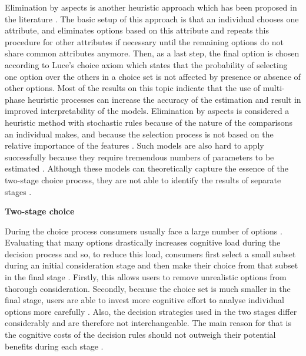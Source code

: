 \documentclass[a4paper,12pt]{article}
\begin{document}
Elimination by aspects is another heuristic approach which has been
proposed in the literature \citep{tversky1972elimination}. The basic setup of this approach is that an individual chooses one attribute, and eliminates options based on this attribute and repeats this procedure for other attributes if necessary until the remaining options do not share common attributes anymore. Then, as a last step, the final option is chosen according to Luce’s choice axiom \citep{luce2012individual} which states that the probability of selecting one option over the others in a choice set is not affected by presence or absence of other options. Most of the results on this topic \citep{batsell1985new,gensch1987two,manrai1989elimination,currim1988disaggregate} indicate that the use of multi-phase heuristic processes can increase the accuracy of the estimation and result in improved interpretability of the models. Elimination by aspects is considered a heuristic method with stochastic rules because of the nature of the comparisons an individual makes, and because the selection process is not based on the relative importance of the features 
\citep{aribarg2018advancing}. Such models are also hard to apply successfully because they require tremendous numbers of parameters to be estimated \citep{batsell1985new}. Although these models can theoretically capture the essence of the two-stage choice process, they are not able to identify the results of separate stages \citep{gilbride2004choice}. 

\textbf{Two-stage choice}

During the choice process consumers usually face a large number of options \citep{payne1988adaptive}. Evaluating that many options drastically increases  cognitive load during the decision process and so, to reduce this load, consumers first select a small subset during an initial consideration  stage \citep{paulssen2005self} and then make their choice  from that subset in the final stage \citep{bettman1979memory, gensch1987two, paulssen2005self}. Firstly, this allows users to remove unrealistic options from thorough consideration. Secondly, 
because the choice set is much smaller in the final stage, users are able to invest more cognitive effort to analyse individual options more carefully \citep{gensch1987two}. Also, the decision strategies used in the two stages differ considerably and are therefore not interchangeable. The main reason for that is the cognitive costs of the decision rules should not outweigh their potential benefits during each stage \citep{bettman1990componential}.
\end{document}
